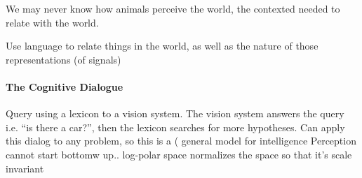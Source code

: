 We may never know how animals perceive the world, the contexted needed
to relate with the world. 

Use language to relate things in the world, as well as the nature of
those representations (of signals)

\paragraph{The Cognitive Dialogue}

Query using a lexicon to a vision system. The vision system answers
the query i.e. ``is there a car?'', then the lexicon searches for more
hypotheses. 
Can apply this dialog to any problem, so this is a ( general model for
intelligence
Perception cannot start bottomw up..
log-polar space normalizes the space so that it's scale invariant

 
